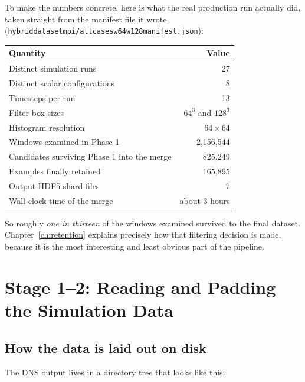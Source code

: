 \documentclass[11pt,a4paper]{report}
\newcommand{\code}[1]{\texttt{#1}}
\renewcommand{\_}{\origtextunderscore\allowbreak}
\begin{document}
To make the numbers concrete, here is what the real production run actually did, taken
straight from the manifest file it wrote
(\code{hybrid\_dataset\_mpi/all\_cases\_w64\_w128\_manifest.json}):

\begin{center}
\begin{tabular}{@{}lr@{}}
\toprule
\textbf{Quantity} & \textbf{Value} \\
\midrule
Distinct simulation runs                      & 27 \\
Distinct scalar configurations                & 8 \\
Timesteps per run                             & 13 \\
Filter box sizes                              & $64^3$ and $128^3$ \\
Histogram resolution                          & $64 \times 64$ \\
Windows examined in Phase 1                   & 2{,}156{,}544 \\
Candidates surviving Phase 1 into the merge   & 825{,}249 \\
Examples finally retained                     & 165{,}895 \\
Output HDF5 shard files                        & 7 \\
Wall-clock time of the merge                  & about 3 hours \\
\bottomrule
\end{tabular}
\end{center}

So roughly \emph{one in thirteen} of the windows examined survived to the final dataset.
Chapter~\ref{ch:retention} explains precisely how that filtering decision is made, because
it is the most interesting and least obvious part of the pipeline.

\chapter{Stage 1--2: Reading and Padding the Simulation Data}

\section{How the data is laid out on disk}

The DNS output lives in a directory tree that looks like this:
\end{document}
